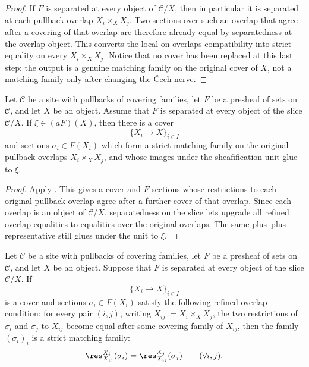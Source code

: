 \begin{proof}
If $F$ is separated at every object of $\mathcal C/X$, then in particular
it is separated at each pullback overlap \(X_i\times_XX_j\). Two sections
over such an overlap that agree after a covering of that overlap are
therefore already equal by separatedness at the overlap object. This
converts the local-on-overlaps compatibility into strict equality on every
$X_i\times_X X_j$. Notice that no cover has been replaced at this last
step: the output is a genuine matching family on the original cover of
\(X\), not a matching family only after changing the \v{C}ech nerve.
\end{proof}

\begin{lemma}\label{lem:strictify-component-representatives}
Let $\mathcal C$ be a site with pullbacks of covering families, let
$F$ be a presheaf of sets on $\mathcal C$, and let \(X\) be an object.
Assume that \(F\) is separated at every object of the slice
\(\mathcal C/X\). If \(\xi\in(aF)(X)\), then there is a cover
\[
\{X_i\to X\}_{i\in I}
\]
and sections \(\sigma_i\in F(X_i)\) which form a strict matching family on
the original pullback overlaps \(X_i\times_X X_j\), and whose images under
the sheafification unit glue to \(\xi\).
\end{lemma}

\begin{proof}
Apply . This gives a
cover and \(F\)-sections whose restrictions to each original pullback
overlap agree after a further cover of that overlap. Since each overlap is
an object of \(\mathcal C/X\), separatedness on the slice lets
 upgrade all refined overlap
equalities to equalities over the original overlaps. The same
plus--plus representative still glues under the unit to \(\xi\).
\end{proof}

\begin{lemma}\label{lem:separated-restriction-refined-equality}
Let $\mathcal C$ be a site with pullbacks of covering families, let $F$
be a presheaf of sets on $\mathcal C$, and let $X$ be an object. Suppose
that $F$ is separated at every object of the slice $\mathcal C/X$. If
\[
\{X_i\to X\}_{i\in I}
\]
is a cover and sections $\sigma_i\in F(X_i)$ satisfy the following
refined-overlap condition: for every pair $(i,j)$, writing
$X_{ij}:=X_i\times_X X_j$, the two restrictions of $\sigma_i$ and
$\sigma_j$ to $X_{ij}$ become equal after some covering family of
$X_{ij}$, then the family $(\sigma_i)_i$ is a strict matching family:
\[
\res_{X_{ij}}^{X_i}(\sigma_i)=\res_{X_{ij}}^{X_j}(\sigma_j)
\qquad(\forall i,j).
\]
\end{lemma}

